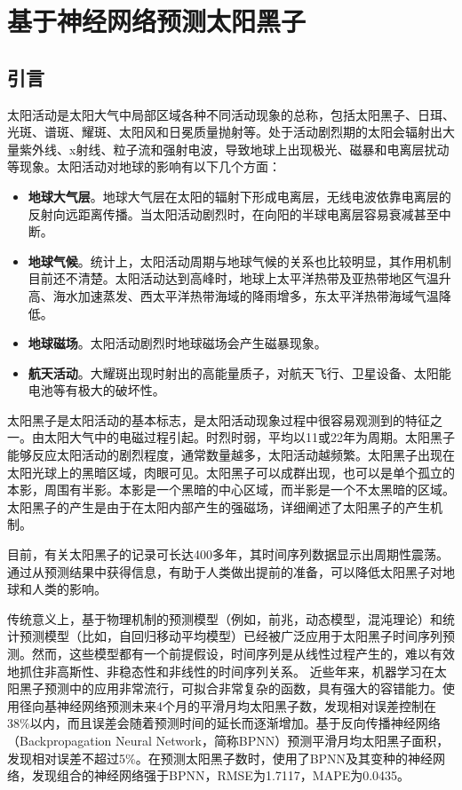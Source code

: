 \chapter{基于神经网络预测太阳黑子}\label{chap:ml_sunspot}

\section{引言}\label{sec:ss_intro}

太阳活动是太阳大气中局部区域各种不同活动现象的总称，包括太阳黑子、日珥、光斑、谱斑、耀斑、太阳风和日冕质量抛射等。处于活动剧烈期的太阳会辐射出大量紫外线、x射线、粒子流和强射电波，导致地球上出现极光、磁暴和电离层扰动等现象。太阳活动对地球的影响有以下几个方面\citep{jie2012prediction}：
\begin{itemize}
  \item \textbf{地球大气层}。地球大气层在太阳的辐射下形成电离层，无线电波依靠电离层的反射向远距离传播。当太阳活动剧烈时，在向阳的半球电离层容易衰减甚至中断。
  \item \textbf{地球气候}。统计上，太阳活动周期与地球气候的关系也比较明显，其作用机制目前还不清楚。太阳活动达到高峰时，地球上太平洋热带及亚热带地区气温升高、海水加速蒸发、西太平洋热带海域的降雨增多，东太平洋热带海域气温降低。
  \item \textbf{地球磁场}。太阳活动剧烈时地球磁场会产生磁暴现象。
  \item \textbf{航天活动}。大耀斑出现时射出的高能量质子，对航天飞行、卫星设备、太阳能电池等有极大的破坏性。
\end{itemize}

太阳黑子是太阳活动的基本标志，是太阳活动现象过程中很容易观测到的特征之一。由太阳大气中的电磁过程引起。时烈时弱，平均以11或22年为周期。太阳黑子能够反应太阳活动的剧烈程度，通常数量越多，太阳活动越频繁。太阳黑子出现在太阳光球上的黑暗区域，肉眼可见。太阳黑子可以成群出现，也可以是单个孤立的本影，周围有半影。本影是一个黑暗的中心区域，而半影是一个不太黑暗的区域。太阳黑子的产生是由于在太阳内部产生的强磁场，\citet{noyes2013sun}详细阐述了太阳黑子的产生机制。

目前，有关太阳黑子的记录可长达400多年，其时间序列数据显示出周期性震荡。通过从预测结果中获得信息，有助于人类做出提前的准备，可以降低太阳黑子对地球和人类的影响。

传统意义上，基于物理机制的预测模型（例如，前兆，动态模型，混沌理论\citep{jie2012prediction}）和统计预测模型（比如，自回归移动平均模型）已经被广泛应用于太阳黑子时间序列预测。然而，这些模型都有一个前提假设，时间序列是从线性过程产生的，难以有效地抓住非高斯性、非稳态性和非线性的时间序列关系\citep{jiang2011sunspot,arlt2015solar}。
近些年来，机器学习在太阳黑子预测中的应用非常流行\citep{pala2019forecasting}，可拟合非常复杂的函数，具有强大的容错能力。\citet{zhao2008prediction}使用径向基神经网络预测未来4个月的平滑月均太阳黑子数，发现相对误差控制在38\%以内，而且误差会随着预测时间的延长而逐渐增加。\citet{ding2012prediction}基于反向传播神经网络（Backpropagation Neural Network，简称BPNN）预测平滑月均太阳黑子面积，发现相对误差不超过5\%。\citet{li2018hybrid}在预测太阳黑子数时，使用了BPNN及其变种的神经网络，发现组合的神经网络强于BPNN，RMSE为1.7117，MAPE为0.0435。

